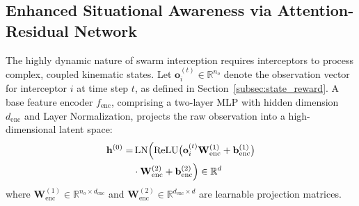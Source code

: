 \documentclass[lettersize,journal]{IEEEtran}
\begin{document}
\subsection{Enhanced Situational Awareness via Attention-Residual Network}
\label{subsec:attention_residual}

The highly dynamic nature of swarm interception requires interceptors to process complex, coupled kinematic states. Let $\mathbf{o}_i^{(t)} \in \mathbb{R}^{n_o}$ denote the observation vector for interceptor $i$ at time step $t$, as defined in Section~\ref{subsec:state_reward}. A base feature encoder $f_{\mathrm{enc}}$, comprising a two-layer MLP with hidden dimension $d_{\mathrm{enc}}$ and Layer Normalization, projects the raw observation into a high-dimensional latent space:
\begin{equation}
\label{eq:encoder}
\begin{split}
\mathbf{h}^{(0)} =& \operatorname{LN}\Bigl(\operatorname{ReLU}\bigl(\mathbf{o}_i^{(t)}\mathbf{W}_{\mathrm{enc}}^{(1)} + \mathbf{b}_{\mathrm{enc}}^{(1)}\bigr) \\
&\cdot \mathbf{W}_{\mathrm{enc}}^{(2)} + \mathbf{b}_{\mathrm{enc}}^{(2)}\Bigr) \in \mathbb{R}^{d}
\end{split}
\end{equation}
where $\mathbf{W}_{\mathrm{enc}}^{(1)} \in \mathbb{R}^{n_o \times d_{\mathrm{enc}}}$ and $\mathbf{W}_{\mathrm{enc}}^{(2)} \in \mathbb{R}^{d_{\mathrm{enc}} \times d}$ are learnable projection matrices.
\end{document}

